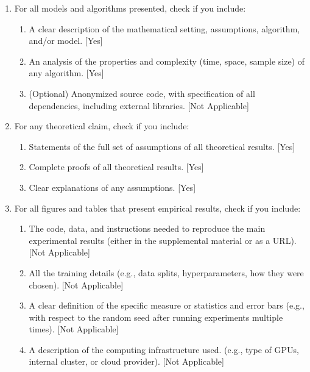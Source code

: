 \documentclass[twoside]{article}
\begin{document}
\begin{enumerate}

  \item For all models and algorithms presented, check if you include:
  \begin{enumerate}
    \item A clear description of the mathematical setting, assumptions, algorithm, and/or model. [Yes]
    \item An analysis of the properties and complexity (time, space, sample size) of any algorithm. [Yes]
    \item (Optional) Anonymized source code, with specification of all dependencies, including external libraries. [Not Applicable]
  \end{enumerate}

  \item For any theoretical claim, check if you include:
  \begin{enumerate}
    \item Statements of the full set of assumptions of all theoretical results. [Yes]
    \item Complete proofs of all theoretical results. [Yes]
    \item Clear explanations of any assumptions. [Yes]     
  \end{enumerate}

  \item For all figures and tables that present empirical results, check if you include:
  \begin{enumerate}
    \item The code, data, and instructions needed to reproduce the main experimental results (either in the supplemental material or as a URL). [Not Applicable]
    \item All the training details (e.g., data splits, hyperparameters, how they were chosen). [Not Applicable]
    \item A clear definition of the specific measure or statistics and error bars (e.g., with respect to the random seed after running experiments multiple times). [Not Applicable]
    \item A description of the computing infrastructure used. (e.g., type of GPUs, internal cluster, or cloud provider). [Not Applicable]
  \end{enumerate}


\end{enumerate}
\end{document}

